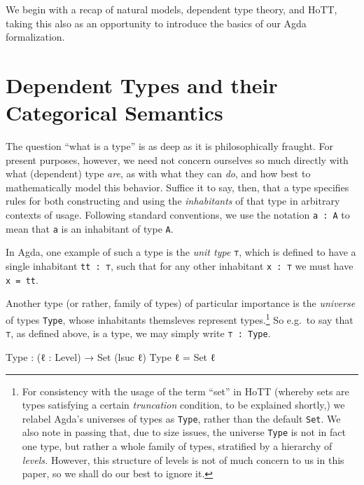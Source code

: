 \documentclass[
  11pt,
  oneside,
  article]{memoir}
\newenvironment{Shaded}{}{}
\newcommand{\DataTypeTok}[1]{\textcolor[rgb]{0.56,0.13,0.00}{#1}}
\newcommand{\NormalTok}[1]{#1}
\newcommand{\OtherTok}[1]{\textcolor[rgb]{0.00,0.44,0.13}{#1}}
\theoremstyle{definition}
\theoremstyle{plain}
\newcommand{\0}{\textsf{0}}
\newcommand{\1}{\tn{\textsf{1}}}
\begin{document}
We begin with a recap of natural models, dependent type theory, and
HoTT, taking this also as an opportunity to introduce the basics of our
Agda formalization.

\section{Dependent Types and their Categorical
Semantics}\label{dependent-types-and-their-categorical-semantics}

The question ``what is a type'' is as deep as it is philosophically
fraught. For present purposes, however, we need not concern ourselves so
much directly with what (dependent) type \emph{are}, as with what they
can \emph{do}, and how best to mathematically model this behavior.
Suffice it to say, then, that a type specifies rules for both
constructing and using the \emph{inhabitants} of that type in arbitrary
contexts of usage. Following standard conventions, we use the notation
\texttt{a\ :\ A} to mean that \texttt{a} is an inhabitant of type
\texttt{A}.

In Agda, one example of such a type is the \emph{unit type} \texttt{⊤},
which is defined to have a single inhabitant \texttt{tt\ :\ ⊤}, such
that for any other inhabitant \texttt{x\ :\ ⊤} we must have
\texttt{x\ =\ tt}.

Another type (or rather, family of types) of particular importance is
the \emph{universe} of types \texttt{Type}, whose inhabitants themsleves
represent types.\footnote{For consistency with the usage of the term
  ``set'' in HoTT (whereby sets are types satisfying a certain
  \emph{truncation} condition, to be explained shortly,) we relabel
  Agda's universes of types as \texttt{Type}, rather than the default
  \texttt{Set}. We also note in passing that, due to size issues, the
  universe \texttt{Type} is not in fact one type, but rather a whole
  family of types, stratified by a hierarchy of \emph{levels.} However,
  this structure of levels is not of much concern to us in this paper,
  so we shall do our best to ignore it.} So e.g.~to say that \texttt{⊤},
as defined above, is a type, we may simply write \texttt{⊤\ :\ Type}.

\begin{Shaded}
\begin{Highlighting}[]
\NormalTok{Type }\OtherTok{:} \OtherTok{(}\NormalTok{ℓ }\OtherTok{:}\NormalTok{ Level}\OtherTok{)} \OtherTok{→} \DataTypeTok{Set} \OtherTok{(}\NormalTok{lsuc ℓ}\OtherTok{)}
\NormalTok{Type ℓ }\OtherTok{=} \DataTypeTok{Set}\NormalTok{ ℓ}
\end{Highlighting}
\end{Shaded}
\end{document}
